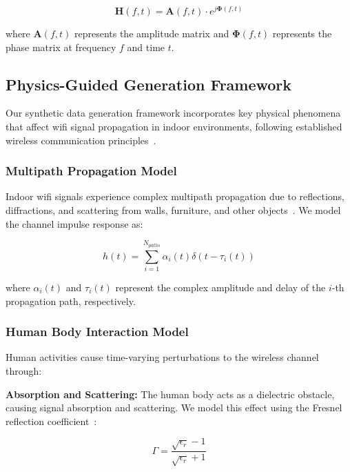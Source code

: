 \documentclass[journal]{IEEEtran}
\begin{document}
\begin{equation}
\mathbf{H}(f,t) = \mathbf{A}(f,t) \cdot e^{j\boldsymbol{\Phi}(f,t)}
\end{equation}

where $\mathbf{A}(f,t)$ represents the amplitude matrix and $\boldsymbol{\Phi}(f,t)$ represents the phase matrix at frequency $f$ and time $t$.

\subsection{Physics-Guided Generation Framework}

Our synthetic data generation framework incorporates key physical phenomena that affect \gls{wifi} signal propagation in indoor environments, following established wireless communication principles~\cite{goldsmith2005wireless}.

\subsubsection{Multipath Propagation Model}

Indoor \gls{wifi} signals experience complex multipath propagation due to reflections, diffractions, and scattering from walls, furniture, and other objects~\cite{multipath_fading2003}. We model the channel impulse response as:

\begin{equation}
h(t) = \sum_{i=1}^{N_{paths}} \alpha_i(t) \delta(t - \tau_i(t))
\end{equation}

where $\alpha_i(t)$ and $\tau_i(t)$ represent the complex amplitude and delay of the $i$-th propagation path, respectively.

\subsubsection{Human Body Interaction Model}

Human activities cause time-varying perturbations to the wireless channel through:

\textbf{Absorption and Scattering:} The human body acts as a dielectric obstacle, causing signal absorption and scattering. We model this effect using the Fresnel reflection coefficient~\cite{fresnel_reflection1995}:

\begin{equation}
\Gamma = \frac{\sqrt{\epsilon_r} - 1}{\sqrt{\epsilon_r} + 1}
\end{equation}
\end{document}
